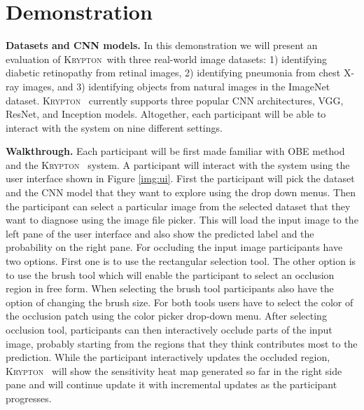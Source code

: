 \documentclass{article}
\newcommand{\system}{\textsc{Krypton}}
\begin{document}
\section{Demonstration}\label{demonstration}
\textbf{Datasets and CNN models.} In this demonstration we will present an evaluation of \system ~with three real-world image datasets: 1) identifying diabetic retinopathy from retinal images, 2) identifying pneumonia from chest X-ray images, and 3) identifying objects from natural images in the ImageNet dataset. \system~ currently supports three popular CNN architectures, VGG, ResNet, and Inception models. Altogether, each participant will be able to interact with the system on nine different settings.

\textbf{Walkthrough.} Each participant will be first made familiar with OBE method and the \system~ system.
A participant will interact with the system using the user interface shown in Figure \ref{img:ui}.
First the participant will pick the dataset and the CNN model that they want to explore using the drop down menus.
Then the participant can select a particular image from the selected dataset that they want to diagnose using the image file picker. This will load the input image to the left pane of the user interface and also show the predicted label and the probability on the right pane.
For occluding the input image participants have two options. First one is to use the rectangular selection tool. The other option is to use the brush tool which will enable the participant to select an occlusion region in free form.
When selecting the brush tool participants also have the option of changing the brush size. For both tools users have to select the color of the occlusion patch using the color picker drop-down menu.
After selecting occlusion tool, participants can then interactively occlude parts of the input image, probably starting from the regions that they think contributes most to the prediction.
While the participant interactively updates the occluded region, \system~ will show the sensitivity heat map generated so far in the right side pane and will continue update it with incremental updates as the participant progresses.

\vspace{-4mm}



\end{document}
